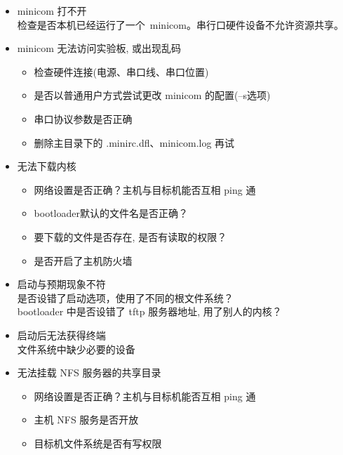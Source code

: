 \begin{itemize}
  \item minicom 打不开\\
		检查是否本机已经运行了一个~minicom。串行口硬件设备不允许资源共享。
  \item minicom 无法访问实验板, 或出现乱码
  \begin{itemize}
	\item 检查硬件连接(电源、串口线、串口位置)
	\item 是否以普通用户方式尝试更改 minicom 的配置(--s选项)
	\item 串口协议参数是否正确
	\item 删除主目录下的 .minirc.dfl、minicom.log 再试
  \end{itemize}
\end{itemize}
\endslide

\begin{itemize}
  \item 无法下载内核
  \begin{itemize}
	\item 网络设置是否正确？主机与目标机能否互相 ping 通
	\item bootloader默认的文件名是否正确？
	\item 要下载的文件是否存在, 是否有读取的权限？
	\item 是否开启了主机防火墙
\end{itemize}
\end{itemize}
\endslide

\begin{itemize}
  \item 启动与预期现象不符\\
		是否设错了启动选项，使用了不同的根文件系统？\\
		bootloader 中是否设错了 tftp 服务器地址, 用了别人的内核？
  \item 启动后无法获得终端\\
		文件系统中缺少必要的设备
  \item 无法挂载 NFS 服务器的共享目录
  \begin{itemize}
	\item 网络设置是否正确？主机与目标机能否互相 ping 通
	\item 主机 NFS 服务是否开放
	\item 目标机文件系统是否有写权限
  \end{itemize}
\end{itemize}
\endslide

